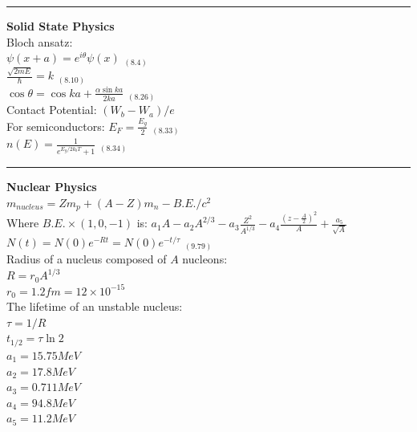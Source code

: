 \documentclass[0pt]{report}
\begin{document}
\begin{multicols*}{3}
\begin{flushleft}
\noindent\rule[0.5ex]{\linewidth}{1pt}
\textbf{Solid State Physics}\\


Bloch ansatz:\\
$\psi(x+a)=e^{i\theta}\psi(x)$ $_{(8.4)}$\\
$\frac{\sqrt{2mE}}{\hslash}=k$ $_{(8.10)}$\\
$\cos\theta=\cos ka+\frac{\alpha\sin ka}{2ka}$ $_{(8.26)}$\\
Contact Potential:
$(W_b-W_a)/e$\\
For semiconductors:
$E_F=\frac{E_g}{2}$ $_{(8.33)}$\\
$n(E)=\frac{1}{e^{E_g/2k_bT}+1}$ $_{(8.34)}$\\

\noindent\rule[0.5ex]{\linewidth}{1pt}
\textbf{Nuclear Physics}\\


$m_{nucleus}=Zm_p+(A-Z)m_n-B.E./c^2$\\
Where $B.E.\times(1,0,-1)$ is:
$a_1A-a_2A^{2/3}-a_3\frac{Z^2}{A^{1/3}}-a_4\frac{(z-\frac{A}{2})^2}{A}+\frac{a_5}{\sqrt{A}}$\\
$N(t)=N(0)e^{-Rt}=N(0)e^{-t/\tau}$ $_{(9.79)}$\\
Radius of a nucleus composed of $A$ nucleons:\\
$R=r_0A^{1/3}$\\
$r_0=1.2fm=12\times10^{-15}$\\
The lifetime of an unstable nucleus:\\
$\tau=1/R$\\
$t_{1/2}=\tau \ln2$\\
$a_1=15.75MeV$\\
$a_2=17.8MeV$\\
$a_3=0.711MeV$\\
$a_4=94.8MeV$\\
$a_5=11.2MeV$\\


\end{flushleft}
\end{multicols*}
\end{document}
